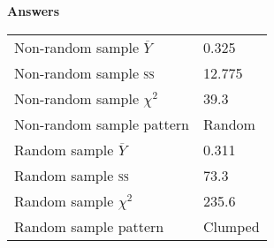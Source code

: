 \documentclass[12pt]{exam}
\begin{document}
\ifprintanswers

\textbf{Answers}

\begin{tabular}{ll}
\toprule
Non-random sample $\overline{Y}$ & 0.325 \\
Non-random sample \textsc{ss} & 12.775 \\
Non-random sample $\chi^2$ & 39.3 \\
Non-random sample pattern & Random \\
\midrule
Random sample $\overline{Y}$ & 0.311 \\
Random sample \textsc{ss} & 73.3 \\
Random sample $\chi^2$ & 235.6 \\
Random sample pattern & Clumped \\
\bottomrule
\end{tabular}

\fi
\end{document}
